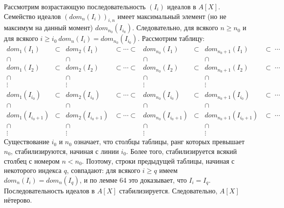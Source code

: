 \documentclass{mai_book}
\begin{document}
\begin{myproof}
Рассмотрим возрастающую последовательность $(I_{i})$ идеалов в $A[X]$. Семейство идеалов $(dom_{n}(I_{i}))_{i,n}$ имеет максимальный элемент (но не максимум на данный момент) $dom_{n_{0}}(I_{i_{0}})$. Следовательно, для всякого $n\geqslant n_{0}$ и для всякого $i\geqslant i_{0}\:dom_{n}(I_{i})=dom_{n_{0}}(I_{i_{0}})$. Рассмотрим таблицу:
$$\begin{array}{cccccccc}
dom_{1}(I_{1}) & \subset & dom_{2}(I_{1}) & \subset\cdots\subset & dom_{n_{0}}(I_{1}) & \subset & dom_{n_{0}+1}(I_{1})&\subset\;\cdots\\
\cap&&\cap&&\cap&&\cap&\\
dom_{1}(I_{2}) & \subset & dom_{2}(I_{2}) & \subset\cdots\subset & dom_{n_{0}}(I_{2}) & \subset & dom_{n_{0}+1}(I_{2})&\subset\;\cdots\\
\cap&&\cap&&\cap&&\cap&\\
\vdots&&\vdots&&\vdots&&\vdots&\\
dom_{1}(I_{i_{0}}) & \subset & dom_{2}(I_{i_{0}}) & \subset\cdots\subset & dom_{n_{0}}(I_{i_{0}}) & \subset & dom_{n_{0}+1}(I_{i_{0}})&\subset\;\cdots\\
\cap&&\cap&&\cap&&\cap&\\
dom_{1}(I_{i_{0}+1}) & \subset & dom_{2}(I_{i_{0}+1}) & \subset\cdots\subset & dom_{n_{0}}(I_{i_{0}+1}) & \subset & dom_{n_{0}+1}(I_{i_{0}+1})&\subset\;\cdots\\
\cap&&\cap&&\cap&&\cap&\\
\vdots&&\vdots&&\vdots&&\vdots&
\end{array}$$
Существование $i_{0}$ и $n_{0}$ означает, что столбцы таблицы, ранг которых превышает $n_{0}$, стабилизируются, начиная с линии $i_{0}$. Более того, стабилизируется всякий столбец с номером $n<n_{0}$. Поэтому, строки предыдущей таблицы, начиная с некоторого индекса $q$, совпадают: для всякого $i\geqslant q$ имеем $dom_{n}(I_{i})=dom_{n}(I_{q})$, и по лемме 64 это доказыва­ет, что $I_{i}=I_{q}$. Последовательность идеалов в $A[X]$ стабилизируется. Следовательно, $A[X]$ нётерово.
\end{myproof}
\end{document}
